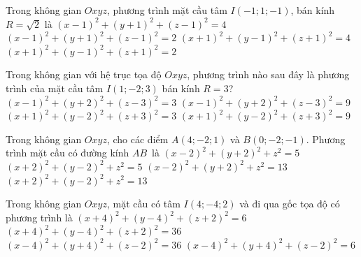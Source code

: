 \begin{ex}%
	Trong không gian $Oxyz$, phương trình mặt  cầu tâm $I(-1;1;-1)$, bán kính $R=\sqrt{2}$ là
	\choice 
		 {$(x-1)^2+(y+1)^2+(z-1)^2=4$}
		 {$(x-1)^2+(y+1)^2+(z-1)^2=2$}
		 {$(x+1)^2+(y-1)^2+(z+1)^2=4$}
		 {\True$(x+1)^2+(y-1)^2+(z+1)^2=2$}
\end{ex}

\begin{ex}%
	Trong không gian với hệ  trục tọa độ $Oxyz$, phương trình nào sau đây là phương trình của mặt cầu tâm $I(1;-2;3)$ bán kính $R=3$?
	\choice 
		 {$(x-1)^2+(y+2)^2+(z-3)^2=3$}
		{\True $(x-1)^2+(y+2)^2+(z-3)^2=9$} 
		{$(x+1)^2+(y-2)^2+(z+3)^2=3$} 
		{$(x+1)^2+(y-2)^2+(z+3)^2=9$} 
\end{ex}

\begin{ex}%
	Trong không gian $Oxyz$, cho  các điểm $A(4;-2;1)$ và $B(0;-2;-1)$. Phương trình mặt cầu có đường kính $AB$~là
	 \choice
		{\True $(x-2)^2 +  (y+2)^2 +z^2 =5$}
		{$(x+2)^2 +  (y-2)^2 +z^2 =5$}
		{$(x-2)^2 + (y+2)^2 +z^2  =13$}
		{$(x+2)^2  + (y-2)^2 +z^2 =13$}
\end{ex}

\begin{ex}%
	Trong không gian $Oxyz$, mặt cầu có  tâm $I\left(4;-4;2\right)$ và đi qua gốc tọa độ có phương trình là
	\choice 
		 {$\left(x+4\right)^2+\left(y-4\right)^2+\left(z+2\right)^2=6$}
		 {$\left(x+4\right)^2+\left(y-4\right)^2+\left(z+2\right)^2=36$}
		{\True  $\left(x-4\right)^2+\left(y+4\right)^2+\left(z-2\right)^2=36$}
		 {$\left(x-4\right)^2+\left(y+4\right)^2+\left(z-2\right)^2=6$}
\end{ex}

